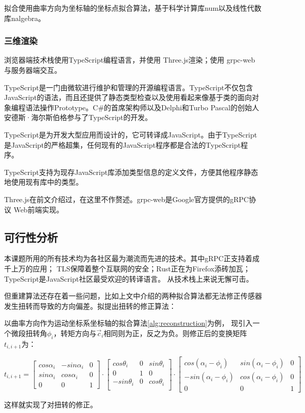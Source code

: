 拟合使用曲率方向为坐标轴的坐标点拟合算法，基于科学计算库num以及线性代数库nalgebra。

\subsubsection{三维渲染}

浏览器端技术栈使用TypeScript编程语言，并使用 Three.js渲染；使用 grpc-web 与服务器端交互。

TypeScript是一门由微软进行维护和管理的开源编程语言。TypeScript不仅包含JavaScript的语法，而且还提供了静态类型检查以及使用看起来像基于类的面向对象编程语法操作Prototype。C\#的首席架构师以及Delphi和Turbo Pascal的创始人安德斯·海尔斯伯格参与了TypeScript的开发。

TypeScript是为开发大型应用而设计的，它可转译成JavaScript。由于TypeScript是JavaScript的严格超集，任何现有的JavaScript程序都是合法的TypeScript程序。

TypeScript支持为现存JavaScript库添加类型信息的定义文件，方便其他程序静态地使用现有库中的类型。

Three.js在前文介绍过，在这里不作赘述。grpc-web是Google官方提供的gRPC协议 Web前端实现。

\subsection{可行性分析}

本课题所用的所有技术均为各社区最为潮流而先进的技术。其中gRPC正支持着成千上万的应用；
TLS保障着整个互联网的安全；Rust正在为Firefox添砖加瓦；TypeScript是JavaScript社区最受欢迎的转译语言。
从技术栈上来说无懈可击。

但重建算法还存在着一些问题，比如上文中介绍的两种拟合算法都无法修正传感器发生扭转而导致的方向偏差。拟提出扭转的修正算法：

以曲率方向作为运动坐标系坐标轴的拟合算法\ref{alg:reconstruction}为例，
现引入一个微段扭转角$\phi_i$，转矩方向与$\vec c_i$相同则为正，反之为负。则修正后的变换矩阵$t_{i, i+1}$为：

\begin{equation}
t_{i, i+1} = \left[
    \begin{matrix}
        cos \alpha_i & -sin \alpha_i & 0 \\
        sin \alpha_i & cos \alpha_i & 0 \\
        0 & 0 & 1
    \end{matrix}
    \right]
    \cdot
    \left[
    \begin{matrix}
        cos \theta_i & 0 & sin \theta_i \\
        0 & 1 & 0 \\
        -sin \theta_i & 0 & cos \theta_i \\
    \end{matrix}
    \right]
    \cdot
    \left[
    \begin{matrix}
        cos (\alpha_i - \phi_i) & sin (\alpha_i - \phi_i) & 0 \\
        -sin (\alpha_i - \phi_i) & cos (\alpha_i - \phi_i) & 0 \\
        0 & 0 & 1
    \end{matrix}
\right]
\end{equation}

这样就实现了对扭转的修正。